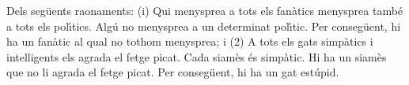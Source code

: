 \begin{enumerate}
\pregunta Dels seg\"{u}ents raonaments: (i) Qui menysprea a tots els fan\`{a}tics
menysprea tamb\'{e} a tots els pol\'{\i}tics. Alg\'{u} no menysprea a un
determinat pol\'{\i}tic. Per conseg\"{u}ent, hi ha un fan\`{a}tic al qual no
tothom menysprea; i (2) A tots els gats simp\`{a}tics i
intel\textperiodcentered ligents els agrada el fetge picat. Cada siam\`{e}s
\'{e}s simp\`{a}tic. Hi ha un siam\`{e}s que no li agrada el fetge picat. Per
conseg\"{u}ent, hi ha un gat est\'{u}pid.

\begin{enumerate}
\end{enumerate}
\feedback
\end{enumerate}
